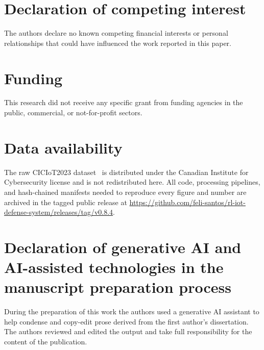 \documentclass[3p,twocolumn]{elsarticle}
\begin{document}
\section*{Declaration of competing interest}
The authors declare no known competing financial interests or personal
relationships that could have influenced the work reported in this paper.

\section*{Funding}
This research did not receive any specific grant from funding agencies in the
public, commercial, or not-for-profit sectors.

\section*{Data availability}
The raw CICIoT2023 dataset~\cite{CICIoT2023Dataset} is distributed under the
Canadian Institute for Cybersecurity license and is not redistributed here. All
code, processing pipelines, and hash-chained manifests needed to reproduce every
figure and number are archived in the tagged public release at
\url{https://github.com/feli-santos/rl-iot-defense-system/releases/tag/v0.8.4}.

\section*{Declaration of generative AI and AI-assisted technologies in the
manuscript preparation process}
During the preparation of this work the authors used a generative AI assistant
to help condense and copy-edit prose derived from the first author's
dissertation. The authors reviewed and edited the output and take full
responsibility for the content of the publication.



\end{document}
